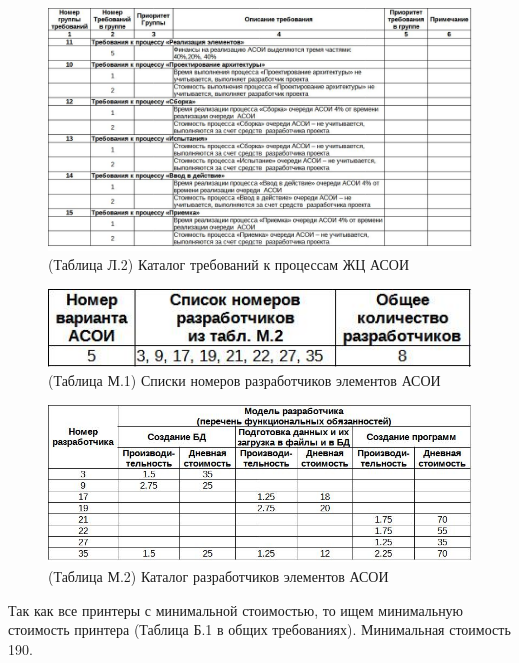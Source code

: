 \documentclass[12pt, a4paper, simple]{eskdtext}
\begin{document}
    \begin{figure}[ph!]
        \centering
        \includegraphics[width=16cm]
            {_docs/КаталогТребованийКПроцессамЖЦАСОИ.jpg}
        \caption{(Таблица Л.2) Каталог требований к процессам ЖЦ АСОИ}
    \end{figure}

    \begin{figure}[ph!]
        \centering
        \includegraphics[]
            {_docs/СпискиНомеровРазработчиковЭлементовАСОИ.jpg}
        \caption{(Таблица М.1) Списки номеров разработчиков элементов АСОИ}
    \end{figure}

    \begin{figure}[ph!]
        \centering
        \includegraphics[width=16cm]
            {_docs/КаталогРазработчиковЭлементовАСОИ.jpg}
        \caption{(Таблица М.2) Каталог разработчиков элементов АСОИ}
    \end{figure}

    \newpage

    Так как все принтеры с минимальной стоимостью, то ищем минимальную стоимость принтера (Таблица Б.1 в общих требованиях).
    Минимальная стоимость 190.
\end{document}
